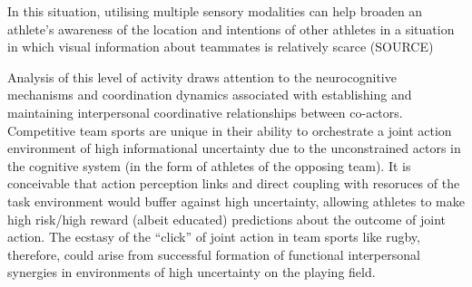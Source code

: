 \begin{CJK}{UTF8}{gbsn}
  In this situation, utilising multiple sensory modalities can help broaden an athlete's awareness of the location and intentions of other athletes in a situation in which visual information about teammates is relatively scarce (SOURCE)


  Analysis of this level of activity draws attention to the neurocognitive mechanisms and coordination dynamics associated with establishing and maintaining interpersonal coordinative relationships between co-actors.  Competitive team sports are unique in their ability to orchestrate a joint action environment of high informational uncertainty due to the unconstrained actors in the cognitive system (in the form of athletes of the opposing team).  It is conceivable that action perception links and direct coupling with resoruces of the task environment would buffer against high uncertainty, allowing athletes to make high risk/high reward (albeit educated) predictions about the outcome of joint action.  The ecstasy of the ``click'' of joint action in team sports like rugby, therefore, could arise from successful formation of functional interpersonal synergies in environments of high uncertainty on the playing field.













\end{CJK}
